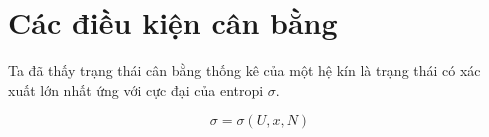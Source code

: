 \chapter{Các điều kiện cân bằng}
	Ta đã thấy trạng thái cân bằng thống kê của một hệ kín là trạng thái có xác xuất lớn nhất ứng với cực đại của entropi $ \sigma $.
	
	\begin{equation}
		\sigma = \sigma\left(U,x,N\right)
	\end{equation}

	
	